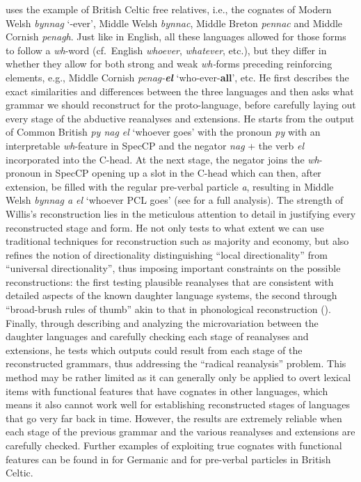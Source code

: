 \documentclass[output=paper,colorlinks,citecolor=brown]{langscibook}
\begin{document}
\citet{mm:willis_reconstructing_2011} uses the example of British Celtic free relatives, i.e., the cognates of Modern Welsh \textit{bynnag} `-ever', Middle Welsh \textit{bynnac}, Middle Breton \textit{pennac} and Middle Cornish \textit{penagh}. Just like in English, all these languages allowed for those forms to follow a \textit{wh}-word (cf.\ English \textit{whoever}, \textit{whatever}, etc.), but they differ in whether they allow for both strong and weak \textit{wh-}forms preceding reinforcing elements, e.g., Middle Cornish \textit{penag-\textbf{el}} `who-ever-\textbf{all}', etc. He first describes the exact similarities and differences between the three languages and then asks what grammar we should reconstruct for the proto-language, before carefully laying out every stage of the abductive reanalyses and extensions. He starts from the output of Common British \textit{py nag el} `whoever goes' with the pronoun \textit{py} with an  interpretable \textit{wh}-feature in SpecCP and the negator \textit{nag} + the verb \textit{el} incorporated into the C-head. At the next stage, the negator joins the \textit{wh}-pronoun in SpecCP opening up a slot in the C-head which can then, after extension, be filled with the regular pre-verbal particle \textit{a}, resulting in Middle Welsh \textit{bynnag a el} `whoever PCL goes' (see \cite[25--36]{mm:willis_reconstructing_2011} for a full analysis). The strength of Willis's reconstruction lies in the meticulous attention to detail in justifying every reconstructed stage and form. He not only tests to what extent we can use traditional techniques for reconstruction such as majority and economy, but also refines the notion of directionality distinguishing “local directionality” from “universal directionality”, thus imposing important constraints on the possible reconstructions: the first testing plausible reanalyses that are consistent with detailed aspects of the known daughter language systems, the second through “broad-brush rules of thumb” akin to that in phonological reconstruction (\cite[36]{mm:willis_reconstructing_2011}). Finally, through describing and analyzing the microvariation between the daughter languages and carefully checking each stage of reanalyses and extensions, he tests which outputs could result from each stage of the reconstructed grammars, thus addressing the “radical reanalysis” problem. This method may be rather limited as it can generally only be applied to overt lexical items with functional features that have cognates in other languages, which means it also cannot work well for establishing reconstructed stages of languages that go very far back in time. However, the results are extremely reliable when each stage of the previous grammar and the various reanalyses and extensions are carefully checked. Further examples of exploiting true cognates with functional features can be found in \citet{mm:walkden_comparative_2009, mm:Walkden2014} for Germanic and \citet{mm:meelen_object-initial_2017} for pre-verbal particles in British Celtic.
\end{document}
